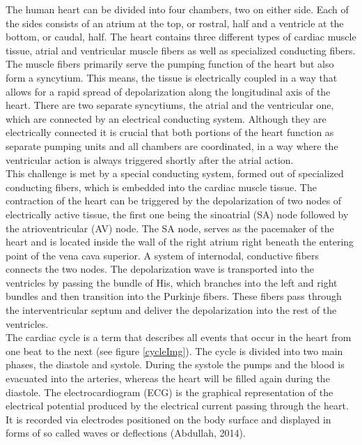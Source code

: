 The human heart can be divided into four chambers, two on either side. Each of the sides consists of an atrium at the top, or rostral, half and a ventricle at the bottom, or caudal, half. The heart contains three different types of cardiac muscle tissue, atrial and ventricular muscle fibers as well as specialized conducting fibers. The muscle fibers primarily serve the pumping function of the heart but also form a syncytium. This means, the tissue is electrically coupled in a way that allows for a rapid spread of depolarization along the longitudinal axis of the heart. There are two separate syncytiums, the atrial and the ventricular one, which are connected by an electrical conducting system. Although they are electrically connected it is crucial that both portions of the heart function as separate pumping units and all chambers are coordinated, in a way where the ventricular action is always triggered shortly after the atrial action.\\
This challenge is met by a special conducting system, formed out of specialized conducting fibers, which is embedded into the cardiac muscle tissue. The contraction of the heart can be triggered by the depolarization of two nodes of electrically active tissue, the first one being the sinoatrial (SA) node followed by the atrioventricular (AV) node. The SA node, serves as the pacemaker of the heart and is located inside the wall of the right atrium right beneath the entering point of the vena cava superior.  
A system of internodal, conductive fibers connects the two nodes. The depolarization wave is transported into the ventricles by passing the bundle of His, which branches into the left and right bundles and then transition into the Purkinje fibers. These fibers pass through the interventricular septum and deliver the depolarization into the rest of the ventricles.\\
The cardiac cycle is a term that describes all events that occur in the heart from one beat to the next (see figure \ref{cycleImg}). The cycle is divided into two main phases, the diastole and systole. During the systole the pumps and the blood is evacuated into the arteries, whereas the heart will be filled again during the diastole. The electrocardiogram (ECG) is the graphical representation of the electrical potential produced by the electrical current passing through the heart. It is recorded via electrodes positioned on the body surface and displayed in forms of so called waves or deflections (Abdullah, 2014).



